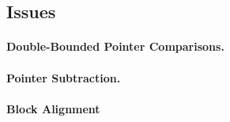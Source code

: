 

\subsection{Issues}
\label{sec:gccsemantics}
\paragraph{Double-Bounded Pointer Comparisons.}
\paragraph{Pointer Subtraction.}
\paragraph{Block Alignment}

%